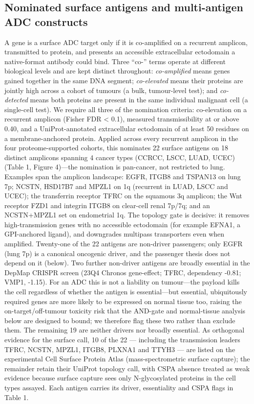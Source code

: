 \documentclass[times, twoside]{zHenriquesLab-StyleBioRxiv}
\begin{document}
\subsection*{Nominated surface antigens and multi-antigen ADC constructs}
A gene is a surface ADC target only if it is co-amplified on a recurrent amplicon, transmitted to protein, and presents an accessible extracellular ectodomain a native-format antibody could bind. Three ``co-'' terms operate at different biological levels and are kept distinct throughout: \emph{co-amplified} means genes gained together in the same DNA segment; \emph{co-elevated} means their proteins are jointly high across a cohort of tumours (a bulk, tumour-level test); and \emph{co-detected} means both proteins are present in the same individual malignant cell (a single-cell test). We require all three of the nomination criteria: co-elevation on a recurrent amplicon (Fisher FDR < 0.1), measured transmissibility at or above 0.40, and a UniProt-annotated extracellular ectodomain of at least 50 residues on a membrane-anchored protein\cite{ref19}. Applied across every recurrent amplicon in the four proteome-supported cohorts, this nominates 22 surface antigens on 18 distinct amplicons spanning 4 cancer types (CCRCC, LSCC, LUAD, UCEC) (Table 1, Figure 4)---the nomination is pan-cancer, not restricted to lung. Examples span the amplicon landscape: EGFR, ITGB8 and TSPAN13 on lung 7p; NCSTN, HSD17B7 and MPZL1 on 1q (recurrent in LUAD, LSCC and UCEC); the transferrin receptor TFRC on the squamous 3q amplicon; the Wnt receptor FZD1 and integrin ITGB8 on clear-cell renal 7p/7q; and an NCSTN+MPZL1 set on endometrial 1q. The topology gate is decisive: it removes high-transmission genes with no accessible ectodomain (for example EFNA1, a GPI-anchored ligand), and downgrades multipass transporters even when amplified. Twenty-one of the 22 antigens are non-driver passengers; only EGFR (lung 7p) is a canonical oncogenic driver, and the passenger thesis does not depend on it (below). Two further non-driver antigens are broadly essential in the DepMap CRISPR screen (23Q4 Chronos gene-effect; TFRC, dependency -0.81; VMP1, -1.15). For an ADC this is not a liability on tumour---the payload kills the cell regardless of whether the antigen is essential---but essential, ubiquitously required genes are more likely to be expressed on normal tissue too, raising the on-target/off-tumour toxicity risk that the AND-gate and normal-tissue analysis below are designed to bound; we therefore flag these two rather than exclude them. The remaining 19 are neither drivers nor broadly essential. As orthogonal evidence for the surface call, 10 of the 22 --- including the transmission leaders TFRC, NCSTN, MPZL1, ITGB8, PLXNA1 and TTYH3 --- are listed on the experimental Cell Surface Protein Atlas\cite{ref20} (mass-spectrometric surface capture); the remainder retain their UniProt topology call, with CSPA absence treated as weak evidence because surface capture sees only N-glycosylated proteins in the cell types assayed. Each antigen carries its driver, essentiality and CSPA flags in Table 1.
\end{document}
